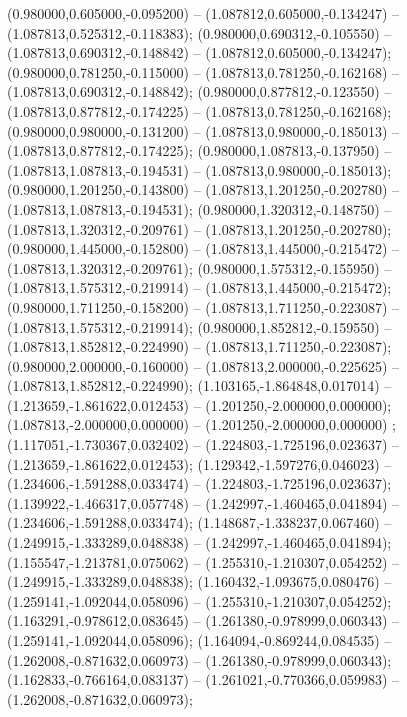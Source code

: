  (0.980000,0.605000,-0.095200) -- (1.087812,0.605000,-0.134247) -- (1.087813,0.525312,-0.118383);
 (0.980000,0.690312,-0.105550) -- (1.087813,0.690312,-0.148842) -- (1.087812,0.605000,-0.134247);
 (0.980000,0.781250,-0.115000) -- (1.087813,0.781250,-0.162168) -- (1.087813,0.690312,-0.148842);
 (0.980000,0.877812,-0.123550) -- (1.087813,0.877812,-0.174225) -- (1.087813,0.781250,-0.162168);
 (0.980000,0.980000,-0.131200) -- (1.087813,0.980000,-0.185013) -- (1.087813,0.877812,-0.174225);
 (0.980000,1.087813,-0.137950) -- (1.087813,1.087813,-0.194531) -- (1.087813,0.980000,-0.185013);
 (0.980000,1.201250,-0.143800) -- (1.087813,1.201250,-0.202780) -- (1.087813,1.087813,-0.194531);
 (0.980000,1.320312,-0.148750) -- (1.087813,1.320312,-0.209761) -- (1.087813,1.201250,-0.202780);
 (0.980000,1.445000,-0.152800) -- (1.087813,1.445000,-0.215472) -- (1.087813,1.320312,-0.209761);
 (0.980000,1.575312,-0.155950) -- (1.087813,1.575312,-0.219914) -- (1.087813,1.445000,-0.215472);
 (0.980000,1.711250,-0.158200) -- (1.087813,1.711250,-0.223087) -- (1.087813,1.575312,-0.219914);
 (0.980000,1.852812,-0.159550) -- (1.087813,1.852812,-0.224990) -- (1.087813,1.711250,-0.223087);
 (0.980000,2.000000,-0.160000) -- (1.087813,2.000000,-0.225625) -- (1.087813,1.852812,-0.224990);
 (1.103165,-1.864848,0.017014) -- (1.213659,-1.861622,0.012453) -- (1.201250,-2.000000,0.000000);
 (1.087813,-2.000000,0.000000) -- (1.201250,-2.000000,0.000000) ;
 (1.117051,-1.730367,0.032402) -- (1.224803,-1.725196,0.023637) -- (1.213659,-1.861622,0.012453);
 (1.129342,-1.597276,0.046023) -- (1.234606,-1.591288,0.033474) -- (1.224803,-1.725196,0.023637);
 (1.139922,-1.466317,0.057748) -- (1.242997,-1.460465,0.041894) -- (1.234606,-1.591288,0.033474);
 (1.148687,-1.338237,0.067460) -- (1.249915,-1.333289,0.048838) -- (1.242997,-1.460465,0.041894);
 (1.155547,-1.213781,0.075062) -- (1.255310,-1.210307,0.054252) -- (1.249915,-1.333289,0.048838);
 (1.160432,-1.093675,0.080476) -- (1.259141,-1.092044,0.058096) -- (1.255310,-1.210307,0.054252);
 (1.163291,-0.978612,0.083645) -- (1.261380,-0.978999,0.060343) -- (1.259141,-1.092044,0.058096);
 (1.164094,-0.869244,0.084535) -- (1.262008,-0.871632,0.060973) -- (1.261380,-0.978999,0.060343);
 (1.162833,-0.766164,0.083137) -- (1.261021,-0.770366,0.059983) -- (1.262008,-0.871632,0.060973);
